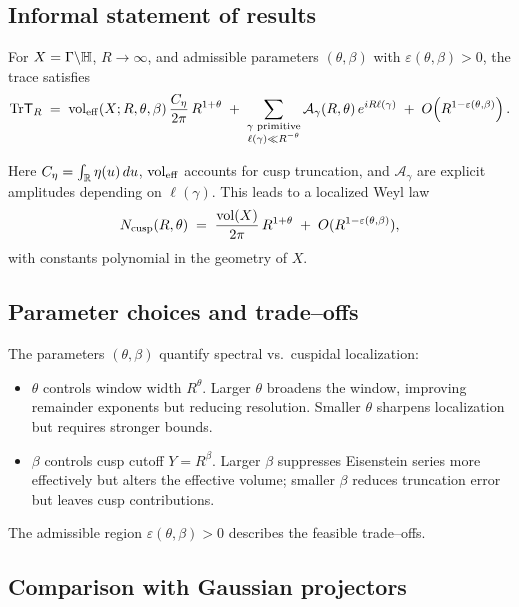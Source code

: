 \subsection{Informal statement of results}\label{subsec:informal}

For $X=\Gamma\backslash\mathbb{H}$, $R\to\infty$, and admissible parameters $(\theta,\beta)$
with $\varepsilon(\theta,\beta)>0$, the trace satisfies
\[
   \mathrm{Tr} \mathsf{T}_R \;=\;
   \operatorname{vol}_{\mathrm{eff}}(X;R,\theta,\beta)\,\frac{C_\eta}{2\pi}\,R^{1+\theta}
   \;+\;
   \sum_{\substack{\gamma \text{ primitive}\\ \ell(\gamma)\ll R^{-\theta}}}
   \mathcal{A}_\gamma(R,\theta)\,e^{iR\ell(\gamma)}
   \;+\;
   O\!\left(R^{1-\varepsilon(\theta,\beta)}\right).
\]

Here $C_\eta=\int_{\mathbb{R}} \eta(u)\,du$, $\operatorname{vol}_{\mathrm{eff}}$ accounts for cusp truncation,
and $\mathcal{A}_\gamma$ are explicit amplitudes depending on $\ell(\gamma)$. This leads
to a localized Weyl law
\[
   N_{\mathrm{cusp}}(R,\theta) \;=\; \frac{\operatorname{vol}(X)}{2\pi}\,R^{1+\theta}
   \;+\; O(R^{1-\varepsilon(\theta,\beta)}),
\]
with constants polynomial in the geometry of $X$.

\subsection{Parameter choices and trade–offs}\label{subsec:params}

The parameters $(\theta,\beta)$ quantify spectral vs.~cuspidal localization:

\begin{itemize}
  \item $\theta$ controls window width $R^\theta$. Larger $\theta$ broadens the window,
        improving remainder exponents but reducing resolution. Smaller $\theta$ sharpens
        localization but requires stronger bounds.
  \item $\beta$ controls cusp cutoff $Y=R^\beta$. Larger $\beta$ suppresses Eisenstein
        series more effectively but alters the effective volume; smaller $\beta$ reduces
        truncation error but leaves cusp contributions.
\end{itemize}

The admissible region $\varepsilon(\theta,\beta)>0$ describes the feasible trade–offs.

\subsection{Comparison with Gaussian projectors}\label{subsec:gaussian}

